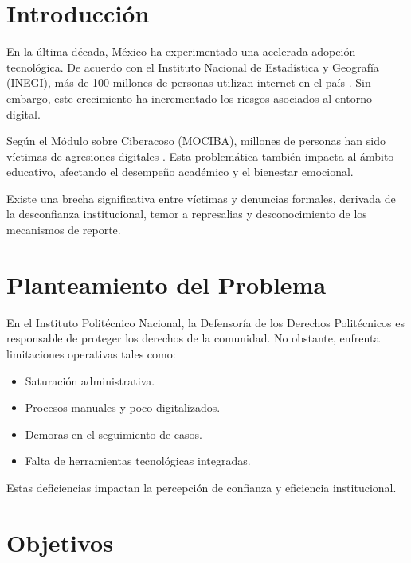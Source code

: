 \documentclass[12pt,oneside]{report}
\begin{document}
\tableofcontents
\newpage


\chapter{Introducción}

En la última década, México ha experimentado una acelerada adopción tecnológica. De acuerdo con el Instituto Nacional de Estadística y Geografía (INEGI), más de 100 millones de personas utilizan internet en el país \cite{ref1}. Sin embargo, este crecimiento ha incrementado los riesgos asociados al entorno digital.

Según el Módulo sobre Ciberacoso (MOCIBA), millones de personas han sido víctimas de agresiones digitales \cite{ref2}. Esta problemática también impacta al ámbito educativo, afectando el desempeño académico y el bienestar emocional.

Existe una brecha significativa entre víctimas y denuncias formales, derivada de la desconfianza institucional, temor a represalias y desconocimiento de los mecanismos de reporte.

\chapter{Planteamiento del Problema}

En el Instituto Politécnico Nacional, la Defensoría de los Derechos Politécnicos es responsable de proteger los derechos de la comunidad. No obstante, enfrenta limitaciones operativas tales como:

\begin{itemize}
    \item Saturación administrativa.
    \item Procesos manuales y poco digitalizados.
    \item Demoras en el seguimiento de casos.
    \item Falta de herramientas tecnológicas integradas.
\end{itemize}

Estas deficiencias impactan la percepción de confianza y eficiencia institucional.

\chapter{Objetivos}
\end{document}
